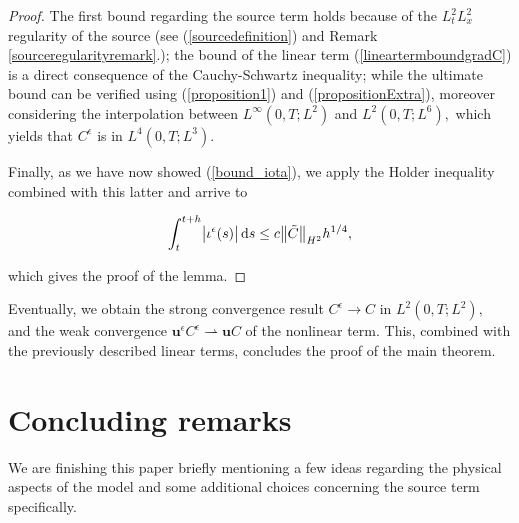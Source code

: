 \documentclass[11pt]{article}
\newcommand*\diff{\mathop{}\!\mathrm{d}}
\begin{document}
\begin{proof}
The first bound regarding the source term holds because of the $L^2_t L^2_x$ regularity of the source (see (\ref{sourcedefinition}) and Remark \ref{sourceregularityremark}.); the bound of the linear term (\ref{lineartermboundgradC}) is a direct consequence of the Cauchy-Schwartz inequality; while the ultimate bound can be verified using (\ref{proposition1}) and (\ref{propositionExtra}), moreover considering the interpolation between $L^\infty(0,T; L^2)$ and $L^2(0,T; L^6),$ which yields that $C^\epsilon$ is in $L^4(0,T; L^3)$.

Finally, as we have now showed (\ref{bound_iota}), we apply the Holder inequality combined with this latter and arrive to

\[ \int_t^{t+h} \abs{\iota^\epsilon (s)} \diff s \leq c \big \| \tilde{C} \big \| _{H^2} h^{1/4},\]

which gives the proof of the lemma.

\end{proof}
   
  Eventually, we obtain the strong convergence result $C^\epsilon \to C$ in $L^2(0,T; L^2),$ and the weak convergence $\mathbf{u}^\epsilon C^\epsilon \rightharpoonup \mathbf{u} C$ of the nonlinear term. This, combined with the previously described linear terms, concludes the proof of the main theorem.

\section{Concluding remarks} \label{concludingremarks}

We are finishing this paper briefly mentioning a few ideas regarding the physical aspects of the model and some additional choices concerning the source term specifically.
\end{document}

